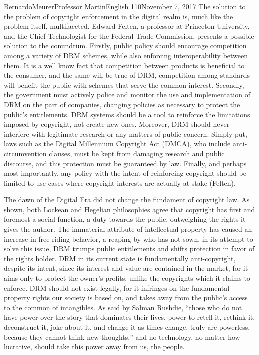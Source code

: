 \documentclass[12pt,letterpaper]{article}
\begin{document}
\begin{mla}{Bernardo}{Meurer}{Professor Martin}{English 110}{November 7, 2017}
        The solution to the problem of copyright enforcement in the digital realm is, much like the problem itself, multifaceted. Edward Felten, a professor at Princeton University, and the Chief Technologist for the Federal Trade Commission, presents a possible solution to the conundrum. Firstly, public policy should encourage competition among a variety of DRM schemes, while also enforcing interoperability between them. It is a well know fact that competition between products is beneficial to the consumer, and the same will be true of DRM, competition among standards will benefit the public with schemes that serve the common interest. Secondly, the government must actively police and monitor the use and implementation of DRM on the part of companies, changing policies as necessary to protect the public's entitlements. DRM systems should be a tool to reinforce the limitations imposed by copyright, not create new ones. Moreover, DRM should never interfere with legitimate research or any matters of public concern. Simply put, laws such as the Digital Millennium Copyright Act (DMCA), who include anti-circumvention clauses, must be kept from damaging research and public discourse, and this protection must be guaranteed by law. Finally, and perhaps most importantly, any policy with the intent of reinforcing copyright should be limited to use cases where copyright interests are actually at stake (Felten).

        The dawn of the Digital Era did not change the fundament of copyright law. As shown, both Lockean and Hegelian philosophies agree that copyright has first and foremost a social function, a duty towards the public, outweighing the rights it gives the author. The immaterial attribute of intellectual property has caused an increase in free-riding behavior, a reaping by who has not sown, in its attempt to solve this issue, DRM trumps public entitlements and shifts protection in favor of the rights holder. DRM in its current state is fundamentally anti-copyright, despite its intent, since its interest and value are contained in the market, for it aims only to protect the owner's profits, unlike the copyrights which it claims to enforce. DRM should not exist legally, for it infringes on the fundamental property rights our society is based on, and takes away from the public's access to the common of intangibles. As said by Salman Rushdie, ``those who do not have power over the story that dominates their lives, power to retell it, rethink it, deconstruct it, joke about it, and change it as times change, truly are powerless, because they cannot think new thoughts,'' and no technology, no matter how lucrative, should take this power away from us, the people.


\end{mla}
\end{document}
